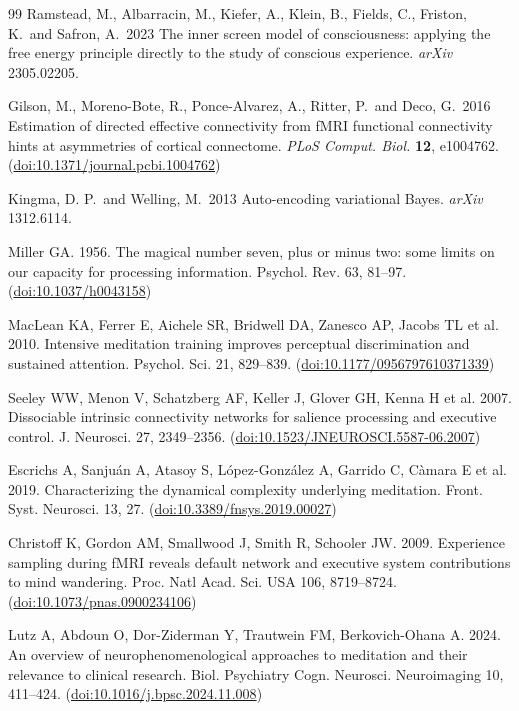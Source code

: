 \documentclass[openacc]{rsproca_new}%
\begin{document}
\begin{thebibliography}{99}
Ramstead, M., Albarracin, M., Kiefer, A., Klein, B., Fields, C., Friston, K.\ and Safron, A.\ 2023 The inner screen model of consciousness: applying the free energy principle directly to the study of conscious experience. \textit{arXiv} 2305.02205.

Gilson, M., Moreno-Bote, R., Ponce-Alvarez, A., Ritter, P.\ and Deco, G.\ 2016 Estimation of directed effective connectivity from fMRI functional connectivity hints at asymmetries of cortical connectome. \textit{PLoS Comput. Biol.} \textbf{12}, e1004762. (\href{https://doi.org/10.1371/journal.pcbi.1004762}{doi:10.1371/journal.pcbi.1004762})

Kingma, D. P.\ and Welling, M.\ 2013 Auto-encoding variational Bayes. \textit{arXiv} 1312.6114.

Miller GA. 1956. The magical number seven, plus or minus two: some limits on our capacity for processing information. Psychol. Rev. 63, 81--97. (\href{https://doi.org/10.1037/h0043158}{doi:10.1037/h0043158})

MacLean KA, Ferrer E, Aichele SR, Bridwell DA, Zanesco AP, Jacobs TL et al. 2010. Intensive meditation training improves perceptual discrimination and sustained attention. Psychol. Sci. 21, 829--839. (\href{https://doi.org/10.1177/0956797610371339}{doi:10.1177/0956797610371339})

Seeley WW, Menon V, Schatzberg AF, Keller J, Glover GH, Kenna H et al. 2007. Dissociable intrinsic connectivity networks for salience processing and executive control. J. Neurosci. 27, 2349--2356. (\href{https://doi.org/10.1523/JNEUROSCI.5587-06.2007}{doi:10.1523/JNEUROSCI.5587-06.2007})

Escrichs A, Sanju\'an A, Atasoy S, L\'opez-Gonz\'alez A, Garrido C, C\`amara E et al. 2019. Characterizing the dynamical complexity underlying meditation. Front. Syst. Neurosci. 13, 27. (\href{https://doi.org/10.3389/fnsys.2019.00027}{doi:10.3389/fnsys.2019.00027})

Christoff K, Gordon AM, Smallwood J, Smith R, Schooler JW. 2009. Experience sampling during fMRI reveals default network and executive system contributions to mind wandering. Proc. Natl Acad. Sci. USA 106, 8719--8724. (\href{https://doi.org/10.1073/pnas.0900234106}{doi:10.1073/pnas.0900234106})

Lutz A, Abdoun O, Dor-Ziderman Y, Trautwein FM, Berkovich-Ohana A. 2024. An overview of neurophenomenological approaches to meditation and their relevance to clinical research. Biol. Psychiatry Cogn. Neurosci. Neuroimaging 10, 411--424. (\href{https://doi.org/10.1016/j.bpsc.2024.11.008}{doi:10.1016/j.bpsc.2024.11.008})


\end{thebibliography}
\end{document}
